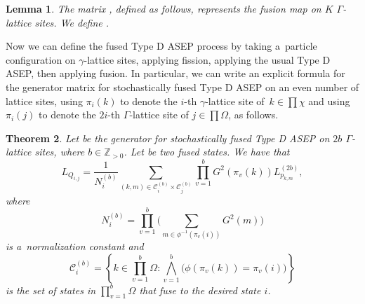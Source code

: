 \documentclass[pdftex]{sigma}
\numberwithin{equation}{section}
\newtheorem{Theorem}{Theorem}[section]
\newtheorem{Lemma}[Theorem]{Lemma}
\theoremstyle{definition}
\begin{document}
\begin{Lemma}
The matrix , defined as follows, represents the fusion map on $K$ $\Gamma$-lattice sites.
We define .
\end{Lemma}

Now we can define the fused Type D ASEP process by taking a~particle configuration on $\gamma$-lattice sites, applying fission, applying the usual Type D ASEP, then applying fusion. In particular, we can write an explicit formula for the generator matrix for stochastically fused Type D ASEP on an even number of lattice sites, using $\pi_i(k)$ to denote the $i$-th $\gamma$-lattice site of~${k \in \prod \chi}$ and using $\pi_i(j)$ to denote the $2i$-th $\Gamma$-lattice site of $j \in \prod \Omega$, as follows.
\begin{Theorem}\label{generator-function}
 Let  be the generator for stochastically fused Type D ASEP on $2b$ $\Gamma$-lattice sites, where $b \in \mathbb{Z}_{> 0}$. Let  be two fused states. We have that
 \[L_{Q_{i,j}} =\frac{1}{N_i^{(b)}}\sum_{(k,m) \in \mathcal{C}^{(b)}_i \times \mathcal{C}^{(b)}_j}\prod_{v=1}^b G^2(\pi_v(k)) L^{(2b)}_{p_{k,m}},
 \]
 where
 \[
 N_i^{(b)} = \prod_{v=1}^b \bigg(\sum_{m \in \phi^{-1}(\pi_v(i))}G^2(m)\bigg)
 \]
 is a~normalization constant and
 \[
 \mathcal{C}^{(b)}_i = \left\{k \in \prod_{v=1}^{b}\Omega \colon \bigwedge_{v=1}^{b}\bigl(\phi(\pi_v(k)) = \pi_v(i)\bigr)\right\}\]
 is the set of states in $\prod\limits_{v=1}^{b}\Omega$ that fuse to the desired state $i$.
\end{Theorem}
\end{document}
